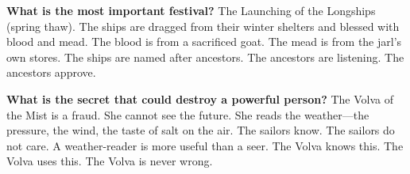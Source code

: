 \begin{almanac}
\textbf{What is the most important festival?} The Launching of the Longships (spring thaw). The ships are dragged from their winter shelters and blessed with blood and mead. The blood is from a sacrificed goat. The mead is from the jarl's own stores. The ships are named after ancestors. The ancestors are listening. The ancestors approve.

\textbf{What is the secret that could destroy a powerful person?} The Volva of the Mist is a fraud. She cannot see the future. She reads the weather---the pressure, the wind, the taste of salt on the air. The sailors know. The sailors do not care. A weather-reader is more useful than a seer. The Volva knows this. The Volva uses this. The Volva is never wrong.
\end{almanac}

\newpage

\newpage
